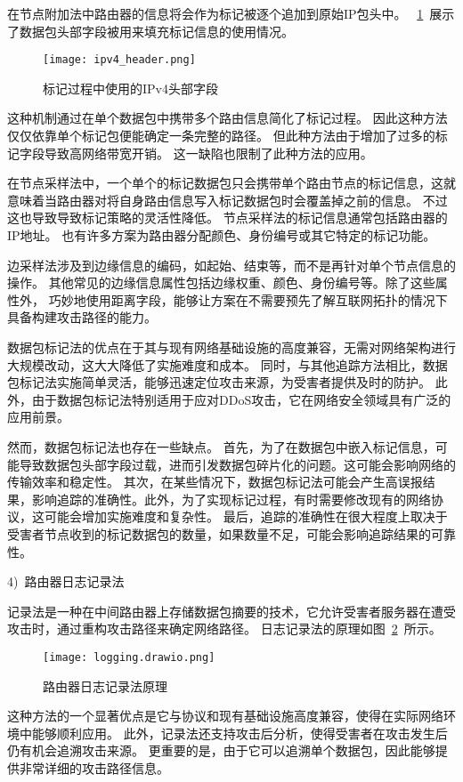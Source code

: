 在节点附加法中路由器的信息将会作为标记被逐个追加到原始IP包头中\cite{suresh2021sanguine,Nur2021Abdullah}。
~\ref{fig:ipv4_header}~展示了数据包头部字段被用来填充标记信息的使用情况。
\begin{figure}[h]
  \centering
  \texttt{[image: ipv4\_header.png]}
  \caption{标记过程中使用的IPv4头部字段}
  \label{fig:ipv4_header}
\end{figure}
这种机制通过在单个数据包中携带多个路由信息简化了标记过程。
因此这种方法仅仅依靠单个标记包便能确定一条完整的路径。
但此种方法由于增加了过多的标记字段导致高网络带宽开销。
这一缺陷也限制了此种方法的应用。\par

在节点采样法中，一个单个的标记数据包只会携带单个路由节点的标记信息，这就意味着当路由器对将自身路由信息写入标记数据包时会覆盖掉之前的信息。
不过这也导致导致标记策略的灵活性降低。
节点采样法的标记信息通常包括路由器的IP地址。
也有许多方案为路由器分配颜色、身份编号或其它特定的标记功能\cite{Zhou2019Linna,Wu2018Bo}。\par

边采样法涉及到边缘信息的编码，如起始、结束等，而不是再针对单个节点信息的操作。
其他常见的边缘信息属性包括边缘权重、颜色、身份编号等。除了这些属性外，
巧妙地使用距离字段，能够让方案在不需要预先了解互联网拓扑的情况下具备构建攻击路径的能力。\par

数据包标记法的优点在于其与现有网络基础设施的高度兼容，无需对网络架构进行大规模改动，这大大降低了实施难度和成本。
同时，与其他追踪方法相比，数据包标记法实施简单灵活，能够迅速定位攻击来源，为受害者提供及时的防护。
此外，由于数据包标记法特别适用于应对DDoS攻击，它在网络安全领域具有广泛的应用前景。\par

然而，数据包标记法也存在一些缺点。
首先，为了在数据包中嵌入标记信息，可能导致数据包头部字段过载，进而引发数据包碎片化的问题。这可能会影响网络的传输效率和稳定性。
其次，在某些情况下，数据包标记法可能会产生高误报结果，影响追踪的准确性。此外，为了实现标记过程，有时需要修改现有的网络协议，这可能会增加实施难度和复杂性。
最后，追踪的准确性在很大程度上取决于受害者节点收到的标记数据包的数量，如果数量不足，可能会影响追踪结果的可靠性。


4)~路由器日志记录法\par
记录法是一种在中间路由器上存储数据包摘要的技术，它允许受害者服务器在遭受攻击时，通过重构攻击路径来确定网络路径。
日志记录法的原理如图~\ref{fig:loggging}~所示。
\begin{figure}[htbp]
  \centering
  \texttt{[image: logging.drawio.png]}
  \caption{路由器日志记录法原理}
  \label{fig:loggging}
\end{figure}
这种方法的一个显著优点是它与协议和现有基础设施高度兼容，使得在实际网络环境中能够顺利应用。
此外，记录法还支持攻击后分析，使得受害者在攻击发生后仍有机会追溯攻击来源。
更重要的是，由于它可以追溯单个数据包，因此能够提供非常详细的攻击路径信息。\par


